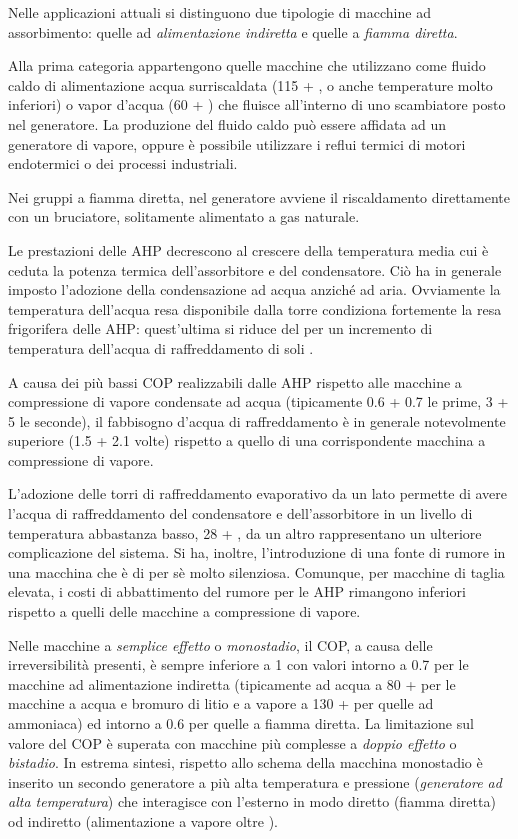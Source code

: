 Nelle applicazioni attuali si distinguono due tipologie di macchine ad assorbimento: quelle ad \emph{alimentazione indiretta} e quelle a \emph{fiamma diretta}.

Alla prima categoria appartengono quelle macchine che utilizzano come fluido caldo di alimentazione acqua surriscaldata (\num{115} + , o anche temperature molto inferiori) o vapor d'acqua (\num{60} + ) che fluisce all'interno di uno scambiatore posto nel generatore. La produzione del fluido caldo può essere affidata ad un generatore di vapore, oppure è possibile utilizzare i reflui termici di motori endotermici o dei processi industriali.

Nei gruppi a fiamma diretta, nel generatore avviene il riscaldamento direttamente con un bruciatore, solitamente alimentato a gas naturale.

Le prestazioni delle AHP decrescono al crescere della temperatura media cui è ceduta la potenza termica dell'assorbitore e del condensatore. Ciò ha in generale imposto l'adozione della condensazione ad acqua anziché ad aria. Ovviamente la temperatura dell'acqua resa disponibile dalla torre condiziona fortemente la resa frigorifera delle AHP: quest'ultima si riduce del  per un incremento di temperatura dell'acqua di raffreddamento di soli .

A causa dei più bassi COP realizzabili dalle AHP rispetto alle macchine a compressione di vapore condensate ad acqua (tipicamente \num{0.6} + \num{0.7} le prime, \num{3} + \num{5} le seconde), il fabbisogno d'acqua di raffreddamento è in generale notevolmente superiore (\num{1.5} + \num{2.1} volte) rispetto a quello di una corrispondente macchina a compressione di vapore. 

L'adozione delle torri di raffreddamento evaporativo da un lato permette di avere l'acqua di raffreddamento del condensatore e dell'assorbitore in un livello di temperatura abbastanza basso, \num{28} + , da un altro rappresentano un ulteriore complicazione del sistema. Si ha, inoltre, l'introduzione di una fonte di rumore in una macchina che è di per sè molto silenziosa. Comunque, per macchine di taglia elevata, i costi di abbattimento del rumore per le AHP rimangono inferiori rispetto a quelli delle macchine a compressione di vapore. 

Nelle macchine a \emph{semplice effetto} o \emph{monostadio}, il COP, a causa delle irreversibilità presenti, è sempre inferiore a \num{1} con valori intorno a \num{0.7} per le macchine ad alimentazione indiretta (tipicamente ad acqua a \num{80} +  per le macchine a acqua e bromuro di litio e a vapore a \num{130} +  per quelle ad ammoniaca) ed intorno a \num{0.6} per quelle a fiamma diretta. La limitazione sul valore del COP è superata con macchine più complesse a \emph{doppio effetto} o \emph{bistadio}. In estrema sintesi, rispetto allo schema della macchina monostadio è inserito un secondo generatore a più alta temperatura e pressione (\emph{generatore ad alta temperatura}) che interagisce con l'esterno in modo diretto (fiamma diretta) od indiretto (alimentazione a vapore oltre ).

